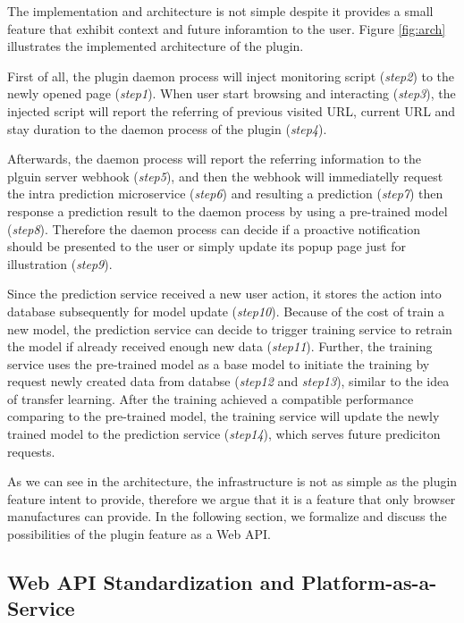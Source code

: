 The implementation and architecture is not simple
despite it provides a small feature that exhibit context and future inforamtion to the user.
Figure \ref{fig:arch} illustrates the implemented architecture of the plugin.

First of all, the plugin daemon process will inject monitoring script (\emph{step2}) to 
the newly opened page (\emph{step1}).
When user start browsing and interacting (\emph{step3}), the injected script will report the referring of
previous visited URL, current URL and stay duration to the daemon process of the plugin (\emph{step4}).

Afterwards, the daemon process will report the referring information to the plguin server webhook (\emph{step5}),
and then the webhook will immediatelly request the intra prediction microservice (\emph{step6}) and resulting a 
prediction (\emph{step7}) then response a prediction result to the daemon process 
by using a pre-trained model (\emph{step8}). Therefore the daemon process can decide 
if a proactive notification should be presented to the user or simply update its popup page
just for illustration (\emph{step9}).

Since the prediction service received a new user action, it stores the action into database
subsequently for model update (\emph{step10}). Because of the cost of train a new model,
the prediction service can decide to trigger training service to retrain the model 
if already received enough new data (\emph{step11}). 
Further, the training service uses the pre-trained model as
a base model to initiate the training by request newly created data from databse (\emph{step12} and \emph{step13}), 
similar to the idea of transfer learning.
After the training achieved a compatible performance comparing to the pre-trained model,
the training service will update the newly trained model to the prediction service (\emph{step14}), which 
serves future prediciton requests.

As we can see in the architecture, the infrastructure is not as simple as the plugin feature
intent to provide, therefore we argue that it is a feature that only browser manufactures
can provide. In the following section, we formalize and discuss 
the possibilities of the plugin feature as a Web API.

\subsection{Web API Standardization and Platform-as-a-Service}

